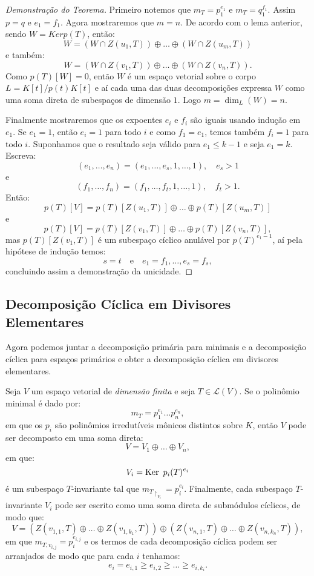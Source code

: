 \documentclass[11pt,twoside,a4paper]{book}
\begin{document}
\begin{proof}[Demonstração do Teorema]
Primeiro notemos que $m_T=p_1^{e_1}$ e $m_T=q_1^{f_1}$. Assim $p=q$ e $e_1=f_1$. Agora mostraremos que $m=n$. De acordo com o lema anterior, sendo $W=Ker p(T)$, então:
\[
W=\left(W\cap Z(u_1,T)\right)\oplus\dots\oplus\left(W\cap Z(u_m,T)\right)
\]
e também:
\[
W=\left(W\cap Z(v_1,T)\right)\oplus\dots\oplus\left(W\cap Z(v_n,T)\right).
\]
Como $p(T)[W]=0$, então $W$ é um espaço vetorial sobre o corpo $L=K[t]/p(t)K[t]$ e aí cada uma das duas decomposições expressa $W$ como uma soma direta de subespaços de dimensão $1$. Logo $m=\dim_L(W)=n$.

\medskip
\noindent
Finalmente mostraremos que os expoentes $e_i$ e $f_i$ são iguais usando indução em $e_1$. Se $e_1=1$, então $e_i=1$ para todo $i$ e como $f_1=e_1$, temos também $f_i=1$ para todo $i$. Suponhamos que o resultado seja válido para $e_1\leq k-1$ e seja $e_1=k$. Escreva:
\[
(e_1,\dots,e_n)=(e_1,\dots,e_s,1,\dots,1),\quad e_s>1
\]
e
\[
(f_1,\dots,f_n)=(f_1,\dots,f_t,1,\dots,1),\quad f_t>1.
\]
Então:
\[
p(T)[V]=p(T)[Z(u_1,T)]\oplus\dots\oplus p(T)[Z(u_m,T)]
\]
e
\[
p(T)[V]=p(T)[Z(v_1,T)]\oplus\dots\oplus p(T)[Z(v_n,T)],
\]
mas $p(T)[Z(v_1,T)]$ é um subespaço cíclico anulável por $p(T)^{e_1-1}$, aí pela hipótese de indução temos:
\[
s=t\quad\text{e}\quad e_1=f_1,\dots,e_s=f_s,
\]
concluindo assim a demonstração da unicidade.
\end{proof}

\subsection{Decomposição Cíclica em Divisores Elementares}

Agora podemos juntar a decomposição primária para minimais e a decomposição cíclica para espaços primários e obter a decomposição cíclica em divisores elementares.

\begin{teorema}
Seja $V$ um espaço vetorial de \emph{dimensão finita} e seja $T\in\mathcal{L}(V)$. Se o polinômio minimal é dado por:
\[
m_T=p_1^{e_1}\dots p_n^{e_n},
\]
em que os $p_i$ são polinômios irredutíveis mônicos distintos sobre $K$, então $V$ pode ser decomposto em uma soma direta:
\[
V=V_1\oplus\dots\oplus V_n,
\]
em que:
\[
V_i=\operatorname{Ker} \ p_i(T)^{e_i}
\]
é um subespaço $T$-invariante tal que $m_{T\upharpoonright_{V_i}}=p_i^{e_i}$. Finalmente, cada subespaço $T$-invariante $V_i$ pode ser escrito como uma soma direta de submódulos cíclicos, de modo que:
\[
V=\left(Z(v_{1,1},T)\oplus\dots\oplus Z(v_{1,k_1},T)\right)\oplus\left(Z(v_{n,1},T)\oplus\dots\oplus Z(v_{n,k_n},T)\right),
\]
em que $m_{T,v_{i,j}}=p_i^{e_{i,j}}$ e os termos de cada decomposição cíclica podem ser arranjados de modo que para cada $i$ tenhamos:
\[
e_i=e_{i,1}\geq e_{i,2}\geq\dots\geq e_{i,k_i}.
\]

\end{teorema}
\end{document}
